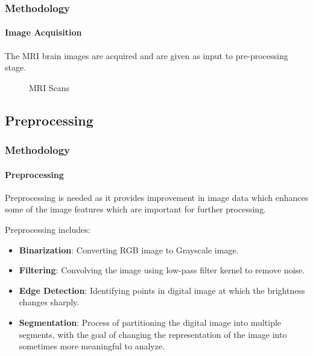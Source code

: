 \documentclass[10pt, aspectratio=169]{beamer}
\begin{document}
	\begin{frame}
		\frametitle{Methodology}
		\framesubtitle{Image Acquisition}
		The MRI brain images are acquired and are given as input to
		pre-processing stage.

		\begin{figure}[H]
			\centering
			\hspace{0.2cm}
			\caption{MRI Scans}
			\label{MRIScans}
		\end{figure}
	\end{frame}

	\subsection{Preprocessing}

	\begin{frame}
		\frametitle{Methodology}
		\framesubtitle{Preprocessing}

		Preprocessing is needed as it provides improvement in image data which
		enhances some of the image features which are important for further
		processing.

		\vspace{0.5cm}

		Preprocessing includes:

		\begin{itemize}
			\item \textbf{Binarization}: Converting RGB image to Grayscale
				image.
			\item \textbf{Filtering}: Convolving the image using low-pass filter
				kernel to remove noise.
			\item \textbf{Edge Detection}: Identifying points in digital image
				at which the brightness changes sharply.
			\item \textbf{Segmentation}: Process of partitioning the digital
				image into multiple segments, with the goal of changing the
				representation of the image into sometimes more meaningful to
				analyze.
		\end{itemize}

	\end{frame}
\end{document}
